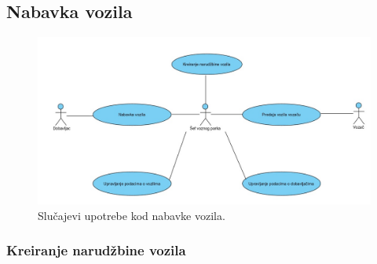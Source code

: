 \newpage

\subsection{\bfseries Nabavka vozila}

\begin{figure}[H]
\begin{center}
\includegraphics[width=\textwidth]{Slike/UseCaseZaVozniPark.jpg}
\end{center}
    \caption{Slučajevi upotrebe kod nabavke vozila.}
\label{fig:contextDiagram}
\end{figure}

\subsubsection{\bfseries Kreiranje narudžbine vozila}

